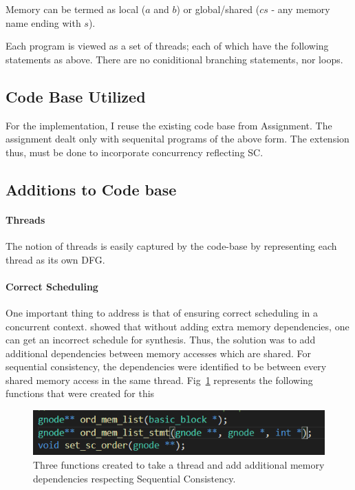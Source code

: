         Memory can be termed as local ($a$ and $b$) or global/shared ($cs$ - any memory name ending with $s$).

        Each program is viewed as a set of threads; each of which have the following statements as above. 
        There are no coniditional branching statements, nor loops. 
        
    \subsection{Code Base Utilized}

        For the implementation, I reuse the existing code base from Assignment. 
        The assignment dealt only with sequenital programs of the above form. 
        The extension thus, must be done to incorporate concurrency reflecting SC.

    \subsection{Additions to Code base}
    
        \paragraph*{Threads}
            The notion of threads is easily captured by the code-base by representing each thread as its own DFG. 
            
        \paragraph*{Correct Scheduling}

            One important thing to address is that of ensuring correct scheduling in a concurrent context.
            \cite{DBLP:conf/fpga/RamanathanFWC17} showed that without adding extra memory dependencies, one can get an incorrect schedule for synthesis. 
            Thus, the solution was to add additional dependencies between memory accesses which are shared. 
            For sequential consistency, the dependencies were identified to be between every shared memory access in the same thread.
            Fig~\ref{scord} represents the following functions that were created for this
            \begin{figure}
                \centering
                \includegraphics[scale=0.5]{Sc-order.PNG}
                \caption{Three functions created to take a thread and add additional memory dependencies respecting Sequential Consistency.}
                \label{scord}
            \end{figure}

